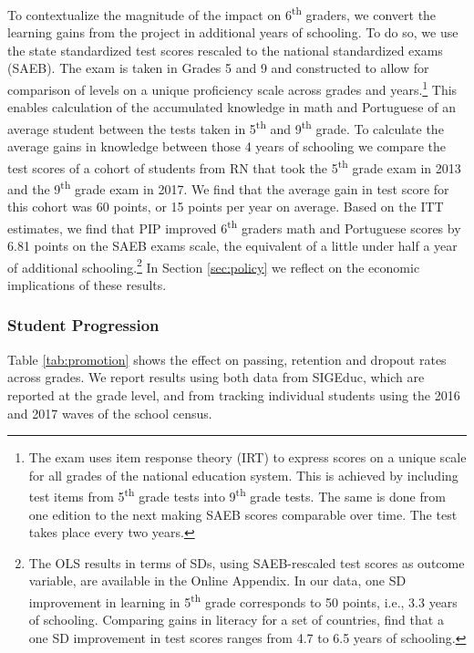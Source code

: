 \documentclass[11pt,a4paper]{article}
\begin{document}
To contextualize the magnitude of the impact on 6\textsuperscript{th} graders, we convert the learning gains from the project in additional years of schooling. To do so, we use the state standardized test scores rescaled to the national standardized exams (SAEB). The exam is taken in Grades 5 and 9 and constructed to allow for comparison of levels on a unique proficiency scale across grades and years.\footnote{The exam uses item response theory (IRT) to express scores on a unique scale for all grades of the national education system. This is achieved by including test items from 5\textsuperscript{th} grade tests into 9\textsuperscript{th} grade tests. The same is done from one edition to the next making SAEB scores comparable over time. The test takes place every two years.} This enables calculation of the accumulated knowledge in math and Portuguese of an average student between the tests taken in 5\textsuperscript{th} and 9\textsuperscript{th} grade. To calculate the average gains in knowledge between those 4 years of schooling we compare the test scores of a cohort of students from RN that took the 5\textsuperscript{th} grade exam in 2013 and the 9\textsuperscript{th} grade exam in 2017. We find that the average gain in test score for this cohort was 60 points, or 15 points per year on average. Based on the ITT estimates, we find that PIP improved 6\textsuperscript{th} graders math and Portuguese scores by 6.81 points on the SAEB exams scale, the equivalent of a little under half a year of additional schooling.\footnote{The OLS results in terms of SDs, using SAEB-rescaled test scores as outcome variable, are available in the Online Appendix. In our data, one SD  improvement in learning in 5\textsuperscript{th} grade corresponds to 50 points, i.e., 3.3 years of schooling. Comparing gains in literacy for a set of countries, \citet{evans2019equivalent} find that a one SD improvement in test scores ranges from 4.7 to 6.5 years of schooling.} In Section \ref{sec:policy} we reflect on the economic implications of these results.

\subsubsection*{Student Progression} \label{sec:flow}

Table \ref{tab:promotion} shows the effect on passing, retention and dropout rates across grades. We report results using both data from SIGEduc, which are reported at the grade level, and from tracking individual students using the 2016 and 2017 waves of the school census. 
\end{document}
